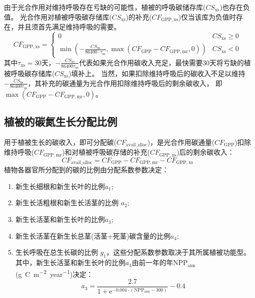 由于光合作用对维持呼吸存在亏缺的可能性，植被的呼吸碳储存库($CS_{\mathrm{xs}}$)也存在负值。
光合作用对植被呼吸碳存储库($CS_{\mathrm{xs}}$)的补充($CF_{\mathrm{GPP,xs}}$)仅当该库为负值时存在，并且须首先满足维持呼吸的需要。
\begin{equation}
  CF_{\mathrm{GPP, xs}}=\left\{\begin{array}{ll}0 & CS_{\mathrm{xs}} \geqslant 0 \\ \min \left(-\frac{CS_{\mathrm{xs}}}{86400 \cdot \tau_{\mathrm{xs}}}, \max \left(CF_{\mathrm{GPP}}-CF_{\mathrm{GPP, mr}}, 0\right)\right) & CS_{\mathrm{xs}}<0\end{array}\right.
\end{equation}
其中$\tau_{\mathrm{xs}}=30$天，$-\frac{CS_{\mathrm{xs}}}{86400 \tau_{\mathrm{xs}}}$代表如果光合作用碳收入充足，最快需要30天将亏缺的植被呼吸碳存储库($CS_{\mathrm{xs}}$)填补上。
当然，如果扣除维持呼吸后的碳收入不足以维持$-\frac{CS_{\mathrm{xs}}}{86400 \tau_{\mathrm{xs}}}$，其补充的碳通量为光合作用扣除维持呼吸后的剩余碳收入，
即$\max{\left(CF_{\mathrm{GPP}}-CF_{\mathrm{GPP,mr}},0\right)}$。


\subsection{植被的碳氮生长分配比例}\label{植被的碳氮生长分配比例}
用于植被生长的碳收入，即可分配碳($CF_{\mathrm{avail\_alloc}}$)，是光合作用碳通量($CF_{\mathrm{GPP}}$)扣除维持呼吸($CF_{\mathrm{GPP,mr}}$)和对植被呼吸碳存储的补充($CF_{\mathrm{GPP,xs}}$)后的剩余碳收入：
\begin{equation}
  CF_{\mathrm{ {avail\_alloc }}}=CF_{\mathrm{GPP}}-CF_{\mathrm{GPP, mr}}-CF_{\mathrm{GPP, xs}}
\end{equation}
植物各器官所分配到的碳的比例由分配系数参数决定：
\begin{enumerate}
  \item 新生长细根和新生长叶的比例$a_1$;
  \item 新生长活粗根和新生长活茎的比例 $a_2$;
  \item 新生长活茎和新生长叶的比例$a_3$;
  \item 新生长活茎在新生长总茎(活茎+死茎)碳含量的比例$a_4$;
  \item 生长呼吸在总生长碳的比例 $g_1$，这些分配系数参数取决于其所属植被功能型。其中，新生长活茎和新生长叶的比例$a_3$由前一年的年$\mathrm{NPP}_{\mathrm{ann}}$ (\unit{g.C.m^{-2}.year^{-1}})决定：
    \begin{equation}
      a_{3}=\frac{2.7}{1+{\mathrm e}^{-0.004 \cdot\left(\text{NPP}_{\mathrm{ann}}-300\right)}}-0.4
    \end{equation}
\end{enumerate}

